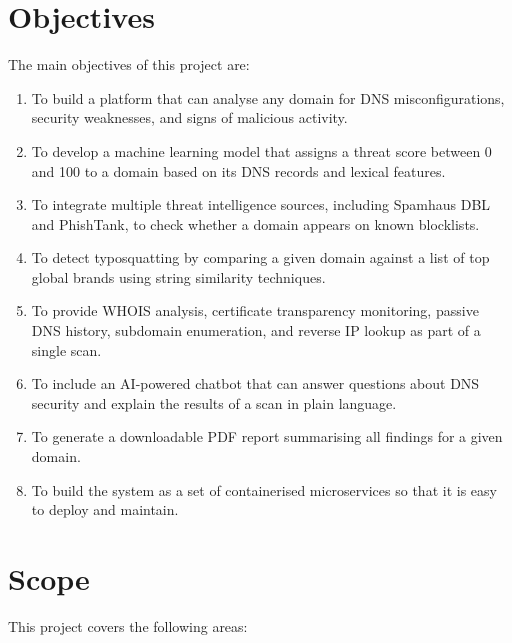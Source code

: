 \documentclass[12pt, a4paper, oneside]{report}
\begin{document}
\section{Objectives}

The main objectives of this project are:

\begin{enumerate}
    \item To build a platform that can analyse any domain for DNS misconfigurations, security weaknesses, and signs of malicious activity.
    \item To develop a machine learning model that assigns a threat score between 0 and 100 to a domain based on its DNS records and lexical features.
    \item To integrate multiple threat intelligence sources, including Spamhaus DBL and PhishTank, to check whether a domain appears on known blocklists.
    \item To detect typosquatting by comparing a given domain against a list of top global brands using string similarity techniques.
    \item To provide WHOIS analysis, certificate transparency monitoring, passive DNS history, subdomain enumeration, and reverse IP lookup as part of a single scan.
    \item To include an AI-powered chatbot that can answer questions about DNS security and explain the results of a scan in plain language.
    \item To generate a downloadable PDF report summarising all findings for a given domain.
    \item To build the system as a set of containerised microservices so that it is easy to deploy and maintain.
\end{enumerate}

\section{Scope}

This project covers the following areas:
\end{document}
